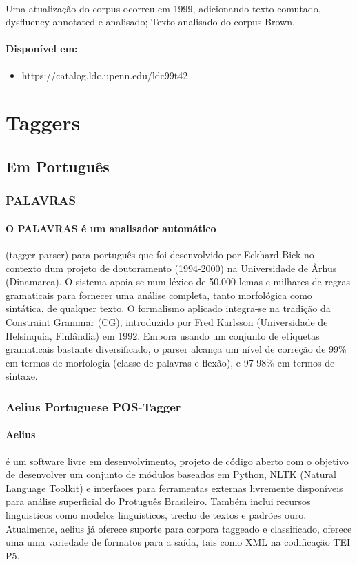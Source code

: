 \documentclass[a4paper, 10pt]{article}
\begin{document}
                \paragraph{}
                Uma atualização do corpus ocorreu em 1999, adicionando texto comutado, dysfluency-annotated e analisado; Texto analisado do corpus Brown.
                
                \paragraph{Disponível em:}
                \begin{itemize}
                    \item https://catalog.ldc.upenn.edu/ldc99t42
                \end{itemize}
    \section{Taggers}
    	\subsection{Em Português}
        	\subsubsection{PALAVRAS}
            	\paragraph{O PALAVRAS é um analisador automático}
            	(tagger-parser) para português que foi desenvolvido por Eckhard Bick no contexto dum projeto de doutoramento (1994-2000) na Universidade de Århus (Dinamarca). O sistema apoia-se num léxico de 50.000 lemas e milhares de regras gramaticais para fornecer uma análise completa, tanto morfológica como sintática, de qualquer texto. O formalismo aplicado integra-se na tradição da Constraint Grammar (CG), introduzido por Fred Karlsson (Universidade de Helsínquia, Finlândia) em 1992. Embora usando um conjunto de etiquetas gramaticais bastante diversificado, o parser alcança um nível de correção de 99\% em termos de morfologia (classe de palavras e flexão), e 97-98\% em termos de sintaxe.
            \subsubsection{Aelius Portuguese POS-Tagger}
                \paragraph{Aelius}
                é um software livre em desenvolvimento, projeto de código aberto com o objetivo de desenvolver um conjunto de módulos baseados em Python, NLTK (Natural Language Toolkit) e interfaces para ferramentas externas livremente disponíveis para análise superficial do Protuguês Brasileiro. Também inclui recursos linguisticos como modelos linguisticos, trecho de textos e padrões ouro. Atualmente, aelius já oferece suporte para corpora taggeado e classificado, oferece uma uma variedade de formatos para a saída, tais como XML na codificação TEI P5.
\end{document}
